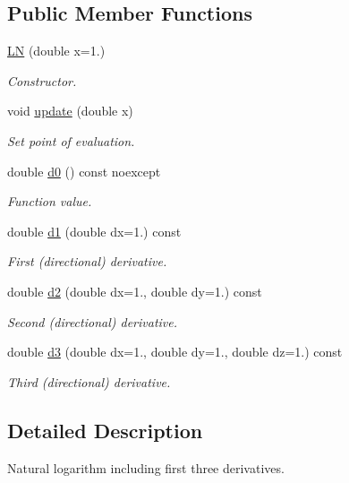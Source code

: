 \subsection*{Public Member Functions}
\begin{DoxyCompactItemize}
\item 
\hyperlink{structfuncy_1_1LN_a26e462e271f179c1e8166071fc4a6c4e}{L\-N} (double x=1.)
\begin{DoxyCompactList}\small\item\em Constructor. \end{DoxyCompactList}\item 
void \hyperlink{structfuncy_1_1LN_acaa2933bb04386d3d261dc57a55b4ead}{update} (double x)
\begin{DoxyCompactList}\small\item\em Set point of evaluation. \end{DoxyCompactList}\item 
double \hyperlink{structfuncy_1_1LN_a21b9ad2a8f0a1327810df36c1584f659}{d0} () const noexcept
\begin{DoxyCompactList}\small\item\em Function value. \end{DoxyCompactList}\item 
double \hyperlink{structfuncy_1_1LN_a6f7bd8efa7fa9d73d91a80b097a88030}{d1} (double dx=1.) const 
\begin{DoxyCompactList}\small\item\em First (directional) derivative. \end{DoxyCompactList}\item 
double \hyperlink{structfuncy_1_1LN_ad532a79f2de8db3e847caaa26fad2c17}{d2} (double dx=1., double dy=1.) const 
\begin{DoxyCompactList}\small\item\em Second (directional) derivative. \end{DoxyCompactList}\item 
double \hyperlink{structfuncy_1_1LN_a73013194d1a196631f6665a5245052b5}{d3} (double dx=1., double dy=1., double dz=1.) const 
\begin{DoxyCompactList}\small\item\em Third (directional) derivative. \end{DoxyCompactList}\end{DoxyCompactItemize}


\subsection{Detailed Description}
Natural logarithm including first three derivatives. 

